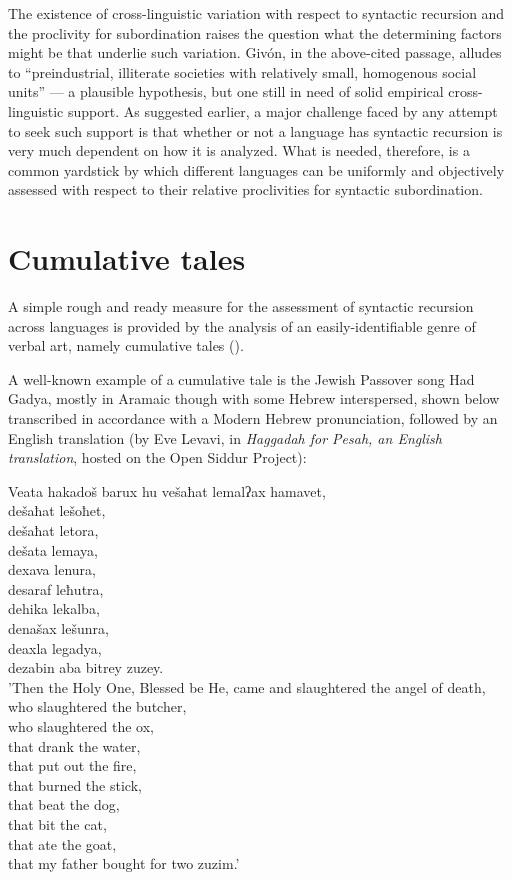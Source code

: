 \documentclass[output=paper,colorlinks,citecolor=brown
]{langscibook}
\begin{document}
The existence of cross-linguistic variation with respect to syntactic recursion and the proclivity for subordination raises the question what the determining factors might be that underlie such variation.  Givón, in the above-cited passage, alludes to ``preindustrial, illiterate societies with relatively small, homogenous social units'' — a plausible hypothesis, but one still in need of solid empirical cross-linguistic support.  As suggested earlier, a major challenge faced by any attempt to seek such support is that whether or not a language has syntactic recursion is very much dependent on how it is analyzed.  What is needed, therefore, is a common yardstick by which different languages can be uniformly and objectively assessed with respect to their relative proclivities for syntactic subordination.

\section{Cumulative tales}
A simple rough and ready measure for the assessment of syntactic recursion across languages is provided by the analysis of an easily-identifiable genre of verbal art, namely cumulative tales (\cites[230—234]{thompson1946folktale}[522:536]{aarne1961types}).

A well-known example of a cumulative tale is the Jewish Passover song Had Gadya, mostly in Aramaic though with some Hebrew interspersed, shown below transcribed in accordance with a Modern Hebrew pronunciation, followed by an English translation (by Eve Levavi, in \emph{Haggadah for Pesah, an English translation}, hosted on the Open Siddur Project):

\ea \label{ex:gil:10}

Veata hakadoš barux hu vešaħat lemalʔax hamavet,\\	
 dešaħat lešoħet,\\
 dešaħat letora,\\
 dešata lemaya,\\
 dexava lenura,\\
 desaraf leħutra,\\
 dehika lekalba,\\
 denašax lešunra,\\
 deaxla legadya,\\
 dezabin aba bitrey zuzey.\\

 'Then the Holy One, Blessed be He, came and slaughtered the angel of death,\\
 who slaughtered the butcher,\\
 who slaughtered the ox, \\
 that drank the water, \\
 that put out the fire, \\
 that burned the stick, \\
 that beat the dog, \\
 that bit the cat, \\
 that ate the goat, \\
 that my father bought for two zuzim.'
\end{document}

